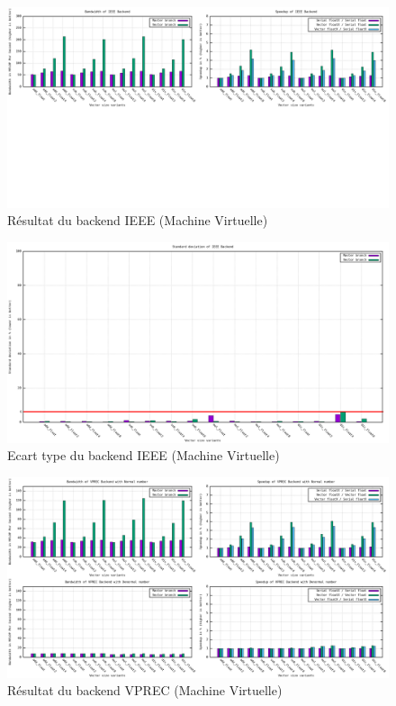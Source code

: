 \documentclass[11pt, letterpaper]{article}
\begin{document}
\label{orgc6fb931}
\begin{figure}[htbp]
\centering
\includegraphics[width=450px]{../ressources/vm_ieee.png}
\caption{\label{fig:org1f0debe}Résultat du backend IEEE (Machine Virtuelle)}
\end{figure}

\label{org3258189}
\begin{figure}[htbp]
\centering
\includegraphics[width=450px]{../ressources/vm_ieee_stddev.png}
\caption{\label{fig:org54af48b}Ecart type du backend IEEE (Machine Virtuelle)}
\end{figure}

\label{org19750b2}
\begin{figure}[htbp]
\centering
\includegraphics[width=450px]{../ressources/vm_vprec.png}
\caption{\label{fig:orgc013be1}Résultat du backend VPREC (Machine Virtuelle)}
\end{figure}
\end{document}
